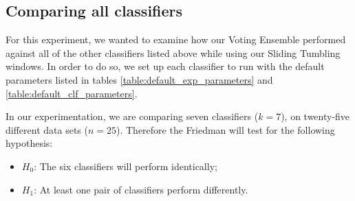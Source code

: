 \subsection{Comparing all classifiers}
For this experiment, we wanted to examine how our Voting Ensemble performed against all of the other classifiers listed above while using our Sliding Tumbling windows.
In order to do so, we set up each classifier to run with the default parameters listed in tables \ref{table:default_exp_parameters} and \ref{table:default_clf_parameters}.

In our experimentation, we are comparing seven classifiers ($k=7$), on twenty-five different data sets ($n=25$). Therefore the Friedman will test for the following hypothesis:
\begin{itemize}
\item $H_0$: The six classifiers will perform identically;
\item $H_1$: At least one pair of classifiers perform differently.
\end{itemize}

